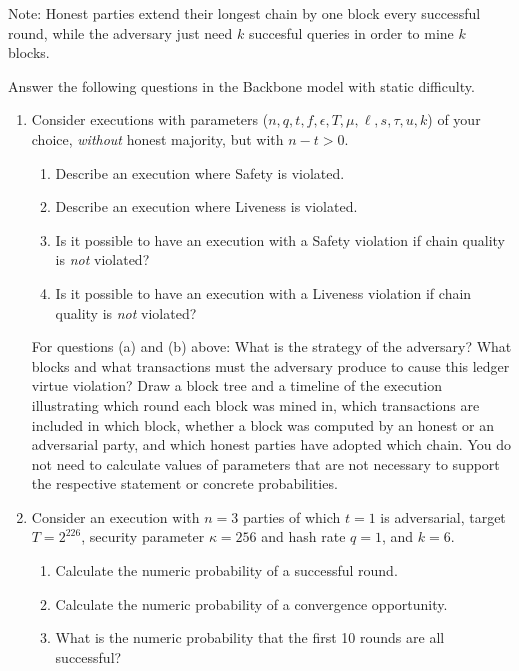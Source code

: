 \begin{problems}
                Note: Honest parties extend their longest chain by one block every successful
                round, while the adversary just need $k$ succesful queries in order to mine $k$
                blocks.


    \item Answer the following questions in the Backbone model with static difficulty.

        \begin{enumerate}
        \item Consider executions with parameters
        ($n, q, t, f, \epsilon, T, \mu, \ell, s, \tau, u, k$) of your choice,
        \emph{without} honest majority, but with $n - t > 0$.

        \begin{enumerate}
            \item Describe an execution where Safety is violated.
            \item Describe an execution where Liveness is violated.
            \item Is it possible to have an execution with a Safety
                violation if chain quality is \emph{not} violated?
            \item Is it possible to have an execution with a Liveness
                violation if chain quality is \emph{not} violated?
        \end{enumerate}

        For questions (a) and (b) above: What is the strategy of the adversary? What
        blocks and what transactions must the adversary produce to cause this ledger
        virtue violation? Draw a block tree and a timeline of the execution
        illustrating which round each block was mined in, which transactions are
        included in which block, whether a block was computed by an honest or an
        adversarial party, and which honest parties have adopted which chain.
        You do not need to calculate values of parameters that are not necessary
        to support the respective statement or concrete probabilities.

        \item Consider an execution with $n = 3$ parties of which $t = 1$ is
            adversarial, target $T = 2^{226}$, security parameter $\kappa = 256$ and
            hash rate $q = 1$, and $k = 6$.

            \begin{enumerate}
                \item Calculate the numeric probability of a successful round.
                \item Calculate the numeric probability of a convergence
                    opportunity.
                \item What is the numeric probability that the first 10 rounds
                    are all successful?
            \end{enumerate}


\end{enumerate}
\end{problems}

